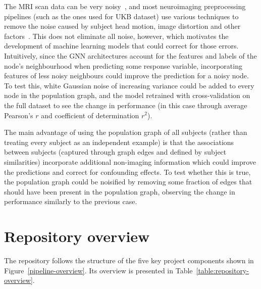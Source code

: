 The MRI scan data can be very noisy~\cite{pervaiz2020optimising,niu2019improved}, and most neuroimaging preprocessing pipelines (such as the ones used for UKB dataset) use various techniques to remove the noise caused by subject head motion, image distortion and other factors~\cite{glasser2013minimal}. This does not eliminate all noise, however, which motivates the development of machine learning models that could correct for those errors. Intuitively, since the GNN architectures account for the features and labels of the node's neighbourhood when predicting some response variable, incorporating features of less noisy neighbours could improve the prediction for a noisy node. To test this, white Gaussian noise of increasing variance could be added to every node in the population graph, and the model retrained with cross-validation on the full dataset to see the change in performance (in this case through average Pearson's $r$ and coefficient of determination $r^2$).

The main advantage of using the population graph of all subjects (rather than treating every subject as an independent example) is that the associations between subjects (captured through graph edges and defined by subject similarities) incorporate additional non-imaging information which could improve the predictions and correct for confounding effects. To test whether this is true, the population graph could be noisified by removing some fraction of edges that should have been present in the population graph, observing the change in performance similarly to the previous case. 


\section{Repository overview}

The repository follows the structure of the five key project components shown in Figure~\ref{pipeline-overview}. Its overview is presented in Table~\ref{table:repository-overview}.


